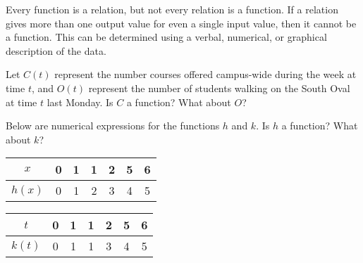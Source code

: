 \documentclass[notes]{subfiles}
\begin{document}
		\noindent Every function is a relation, but not every relation is a function.  If a relation gives more than one output value for even a single input value, then it cannot be a function.  This can be determined using a verbal, numerical, or graphical description of the data.
	\begin{ex}
		Let $C(t)$ represent the number courses offered campus-wide during the week at time $t$, and $O(t)$ represent the number of students walking on the South Oval at time $t$ last Monday.   Is $C$ a function?  What about $O$?
		\end{ex}	
		\begin{ex} 
			Below are numerical expressions for the functions $h$ and $k$.  Is $h$ a function?  What about $k$?
			\begin{center}
				{\renewcommand{\arraystretch}{1.2}
				\begin{tabular}{|c|c|c|c|c|c|c|} \hline
					$x$ & 0 & 1 & 1 & 2 & 5 & 6 \\ \hline
					$h(x)$ & 0& 1 & 2 & 3 & 4 & 5 \\ \hline
				\end{tabular}\hspace*{15pt}
				\begin{tabular}{|c|c|c|c|c|c|c|} \hline
						$t$ & 0 & 1 & 1 & 2 & 5 & 6 \\ \hline
						$k(t)$ & 0 & 1 & 1 & 3 & 4 & 5 \\ \hline
					\end{tabular}
				}
				\end{center}
		\end{ex}			
\end{document}
